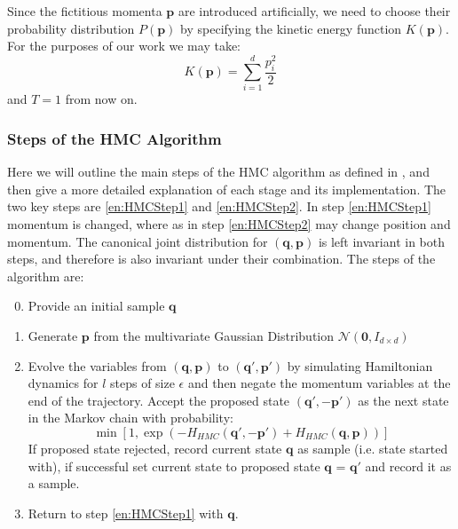 \documentclass[12pt]{article}
\begin{document}
            Since the fictitious momenta $\bm{p}$ are introduced artificially, we need to choose their probability distribution $P\left(\bm{p}\right)$ by specifying the kinetic energy function $K\left(\bm{p}\right)$. For the purposes of our work we may take:
            \begin{equation}
                \label{eq:HMCQuadraticKineticEnergy}
                K\left(\bm{p}\right) = \sum_{i=1}^{d}\frac{p_i^2}{2}
            \end{equation}
            and $T=1$ from now on.

            \subsubsection{Steps of the HMC Algorithm}
            Here we will outline the main steps of the HMC algorithm as defined in \cite{duane_kennedy_pendleton_roweth_1987}, \cite{kennedy_pendleton_2001} and \cite{neal_2011} then give a more detailed explanation of each stage and its implementation. The two key steps are \ref{en:HMCStep1} and \ref{en:HMCStep2}. In step \ref{en:HMCStep1} momentum is changed, where as in step \ref{en:HMCStep2} may change position and momentum. The canonical joint distribution for $\left(\bm{q},\bm{p}\right)$ is left invariant in both steps, and therefore is also invariant under their combination. The steps of the algorithm are:
            \begin{enumerate}
                \setcounter{enumi}{-1}
                \item \label{en:HMCStep0} Provide an initial sample $\bm{q}$
                \item \label{en:HMCStep1} Generate $\bm{p}$ from the multivariate Gaussian Distribution $\mathcal{N}\left(\bm{0},I_{d\times d}\right)$ 
                \item \label{en:HMCStep2} Evolve the variables from $\left(\bm{q},\bm{p}\right)$ to $\left(\bm{q}',\bm{p}'\right)$ by simulating Hamiltonian dynamics for $l$ steps of size $\epsilon$ and then negate the momentum variables at the end of the trajectory. Accept the proposed state $\left(\bm{q}',-\bm{p}'\right)$ as the next state in the Markov chain with probability:
                        \begin{equation*}
                            \min{\left[1,\exp{\left(-H_{HMC}\left(\bm{q}',-\bm{p}'\right)+ \allowbreak H_{HMC}\left(\bm{q},\bm{p}\right)\right)}\right]}
                        \end{equation*}
                        If proposed state rejected, record current state $\bm{q}$ as sample (i.e. state started with), if successful set current state to proposed state $\bm{q}$ = $\bm{q}'$ and record it as a sample.
                \item \label{en:HMCStep5} Return to step \ref{en:HMCStep1} with $\bm{q}$.
            \end{enumerate}
\end{document}
